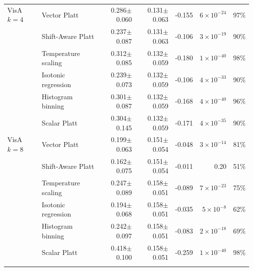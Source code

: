 \begin{table}[t]
\begin{tabular}{llrrrrr}
\addlinespace[2pt]
VisA $k{=}4$ & Vector Platt & 0.286$\pm$0.060 & 0.131$\pm$0.063 & -0.155 & $6{\times}10^{-24}$ & 97\% \\
 & Shift-Aware Platt & 0.237$\pm$0.087 & 0.131$\pm$0.063 & -0.106 & $3{\times}10^{-19}$ & 90\% \\
 & Temperature scaling & 0.312$\pm$0.085 & 0.132$\pm$0.059 & -0.180 & $1{\times}10^{-40}$ & 98\% \\
 & Isotonic regression & 0.239$\pm$0.073 & 0.132$\pm$0.059 & -0.106 & $4{\times}10^{-33}$ & 90\% \\
 & Histogram binning & 0.301$\pm$0.087 & 0.132$\pm$0.059 & -0.168 & $4{\times}10^{-40}$ & 96\% \\
 & Scalar Platt & 0.304$\pm$0.145 & 0.132$\pm$0.059 & -0.171 & $4{\times}10^{-35}$ & 90\% \\
\addlinespace[2pt]
VisA $k{=}8$ & Vector Platt & 0.199$\pm$0.063 & 0.151$\pm$0.054 & -0.048 & $3{\times}10^{-14}$ & 81\% \\
 & Shift-Aware Platt & 0.162$\pm$0.075 & 0.151$\pm$0.054 & -0.011 & 0.20 & 51\% \\
 & Temperature scaling & 0.247$\pm$0.089 & 0.158$\pm$0.051 & -0.089 & $7{\times}10^{-23}$ & 75\% \\
 & Isotonic regression & 0.194$\pm$0.068 & 0.158$\pm$0.051 & -0.035 & $5{\times}10^{-8}$ & 62\% \\
 & Histogram binning & 0.242$\pm$0.097 & 0.158$\pm$0.051 & -0.083 & $2{\times}10^{-18}$ & 69\% \\
 & Scalar Platt & 0.418$\pm$0.100 & 0.158$\pm$0.051 & -0.259 & $1{\times}10^{-40}$ & 98\% \\
\addlinespace[2pt]
\bottomrule
\end{tabular}
\end{table}
